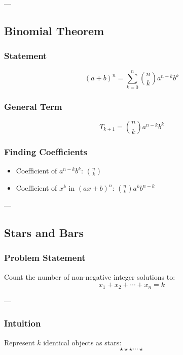 \documentclass[11pt]{article}
\begin{document}
---

\subsection{Binomial Theorem}

\subsubsection{Statement}
\[
(a + b)^n = \sum_{k=0}^{n} \binom{n}{k} a^{n-k} b^k
\]

\subsubsection{General Term}
\[
T_{k+1} = \binom{n}{k} a^{n-k} b^k
\]

\subsubsection{Finding Coefficients}
\begin{itemize}
    \item Coefficient of $a^{n-k}b^k$: $\binom{n}{k}$
    \item Coefficient of $x^k$ in $(ax+b)^n$: $\binom{n}{k}a^k b^{n-k}$
\end{itemize}

---

\subsection{Stars and Bars}

\subsubsection{Problem Statement}
Count the number of non-negative integer solutions to:
\[
x_1 + x_2 + \cdots + x_n = k
\]

---

\subsubsection{Intuition}

Represent $k$ identical objects as stars:
\[
\star \star \star \cdots \star
\]
\end{document}
